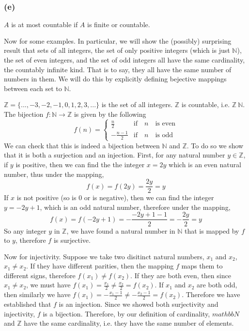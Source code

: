 \documentclass[../../templates/section]{subfiles}
\begin{document}
\begin{definition}
\begin{definition}
\subsubsection*{(e)}
$A$ is at most countable if $A$ is finite or countable.
\end{definition}

Now for some examples. In particular, we will show the (possibly) surprising result 
that sets of all integers, the set of only positive integers (which is just 
$\mathbb{N}$), the set of even integers, and the set of odd integers all have the 
same cardinality, the countably infinite kind. 
That is to say, they all have the same number of numbers in them. 
We will do this by explicitly defining bejective mappings between each set to 
$\mathbb{N}$.

\begin{example}
$\mathbb{Z}=\{...,-3,-2,-1,0,1,2,3,...\}$ is the set of all integers. $\mathbb{Z}$ is
countable, i.e. $\mathbb{Z}~\mathbb{N}$. The bijection 
$f:\mathbb{N} \rightarrow \mathbb{Z}$ is given by the following
\[ 
f(n)=
\begin{cases} 
      \frac{n}{2} & \text{if} \quad n \quad \text{is even} \\
      -\frac{n-1}{2} & \text{if} \quad n \quad \text{is odd}
   \end{cases}
\]
We can check that this is indeed a bijection between $\mathbb{N}$ and $\mathbb{Z}$.
To do so we show that it is both a surjection and an injection. First, for any natural 
number $y\in \mathbb{Z}$, if $y$ is positive, then we can find the the integer $x=2y$ 
which is an even natural number, thus under the mapping, 
\[
f(x)=f(2y)=\frac{2y}{2}=y
\] 
If $x$ is not positive (so is 0 or is negative), then we can find the integer 
$y=-2y+1$, which is an odd natural number, therefore under the mapping,
\[
f(x)=f(-2y+1)=-\frac{-2y+1-1}{2}=-\frac{2y}{2}=y
\]
So any integer $y$ in $\mathbb{Z}$, we have found a natural number in $\mathbb{N}$ 
that is mapped by $f$ to $y$, therefore $f$ is surjective.

Now for injectivity. Suppose we take two disitinct natural numbers, $x_1$ and $x_2$, 
$x_1\neq x_2$. If they have different parities, then the mapping $f$ maps them to 
different signs, therefore $f(x_1)\neq f(x_2)$. If they are both even, then since 
$x_1\neq x_2$, we must have $f(x_1)=\frac{x_1}{2}\neq \frac{x_2}{2}=f(x_2)$. If $x_1$
 and $x_2$ are both odd, then similarly we have 
$f(x_1)=-\frac{x_1-1}{2}\neq -\frac{x_2-1}{2}=f(x_2)$. Therefore we have established 
that $f$ is an injection. Since we showed both surjectivity and injectivity, $f$ is 
a bijection. Therefore, by our definition of cardinality, $mathbb{N}$ and $\mathbb{Z}$ 
have the same cardinality, i.e. they have the same number of elements.


\end{example}
\end{definition}
\end{document}
